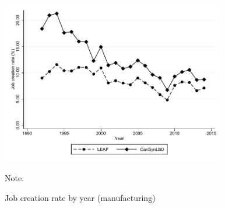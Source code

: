 \begin{figure} [H]
\centering
\caption{Job creation rate  by year (manufacturing)} \label{JobCreationManufacturing}
\includegraphics[height=2.8in, width=.7\linewidth]{graphs/Job_creation_rate_by_year_Manufacturing_bw.pdf} 
\begin{minipage}{0.85\textwidth}
{\footnotesize Note: \CanTableNote \par}
\end{minipage}
\end{figure}


